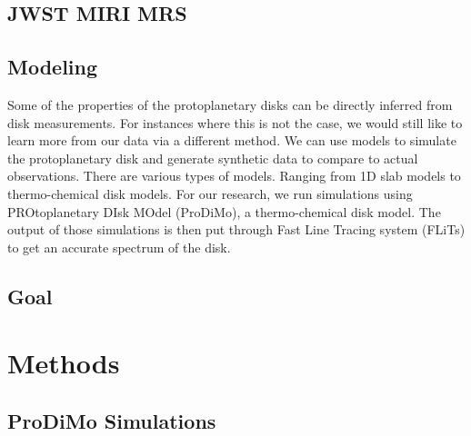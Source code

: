 \documentclass[twoside, single, authoryear, semicolon]{lion-msc}
\newcommand{\3}{$_3$}
\newcommand{\2}{$_2$}
\begin{document}
\section{JWST MIRI MRS}

\section{Modeling}
Some of the properties of the protoplanetary disks can be directly inferred from disk measurements. For instances where this is not the case, we would still like to learn more from our data via a different method. We can use models to simulate the protoplanetary disk and generate synthetic data to compare to actual observations. There are various types of models. Ranging from 1D slab models to thermo-chemical disk models. For our research, we run simulations using PROtoplanetary DIsk MOdel (ProDiMo), a thermo-chemical disk model. The output of those simulations is then put through Fast Line Tracing system (FLiTs) to get an accurate spectrum of the disk. 
\section{Goal}

\chapter{Methods}\label{Ch: Methods}
\section{ProDiMo Simulations}
\end{document}
